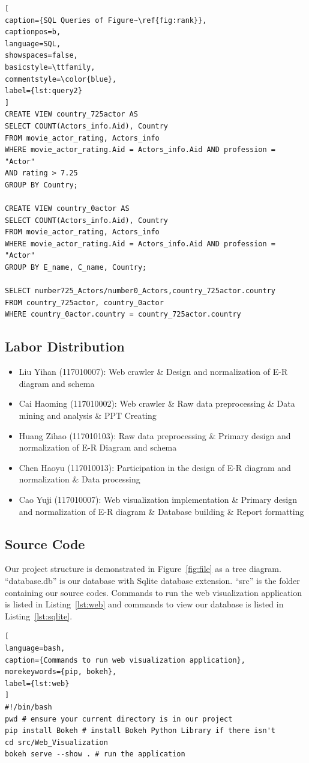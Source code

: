 \documentclass[a4paper]{article}
\begin{document}
\begin{lstlisting}[
caption={SQL Queries of Figure~\ref{fig:rank}},
captionpos=b,
language=SQL,
showspaces=false,
basicstyle=\ttfamily,
commentstyle=\color{blue},
label={lst:query2}
]
CREATE VIEW country_725actor AS
SELECT COUNT(Actors_info.Aid), Country
FROM movie_actor_rating, Actors_info
WHERE movie_actor_rating.Aid = Actors_info.Aid AND profession = "Actor"
AND rating > 7.25
GROUP BY Country;

CREATE VIEW country_0actor AS
SELECT COUNT(Actors_info.Aid), Country
FROM movie_actor_rating, Actors_info
WHERE movie_actor_rating.Aid = Actors_info.Aid AND profession = "Actor"
GROUP BY E_name, C_name, Country;

SELECT number725_Actors/number0_Actors,country_725actor.country
FROM country_725actor, country_0actor
WHERE country_0actor.country = country_725actor.country
\end{lstlisting}

\subsection*{Labor Distribution}
\begin{itemize}
  \item Liu Yihan (117010007): Web crawler \& Design and normalization of E-R diagram and schema
  \item Cai Haoming (117010002): Web crawler \& Raw data preprocessing \& Data mining and analysis \& PPT Creating
  \item Huang Zihao (117010103): Raw data preprocessing \& Primary design and normalization of E-R Diagram and schema
  \item Chen Haoyu (117010013): Participation in the design of E-R diagram and normalization \& Data processing
  \item Cao Yuji (117010007): Web visualization implementation \& Primary design and normalization of E-R diagram \& Database building \& Report formatting

\end{itemize}

\subsection*{Source Code}

Our project structure is demonstrated in Figure~\ref{fig:file} as a tree diagram. ``database.db'' is our database with Sqlite database extension. ``src'' is the folder containing our source codes. Commands to run the web visualization application is listed in Listing~\ref{lst:web} and commands to view our database is listed in Listing~\ref{lst:sqlite}.
\begin{lstlisting}[
language=bash,
caption={Commands to run web visualization application},
morekeywords={pip, bokeh},
label={lst:web}
]
#!/bin/bash
pwd # ensure your current directory is in our project
pip install Bokeh # install Bokeh Python Library if there isn't
cd src/Web_Visualization
bokeh serve --show . # run the application
\end{lstlisting}
\end{document}
